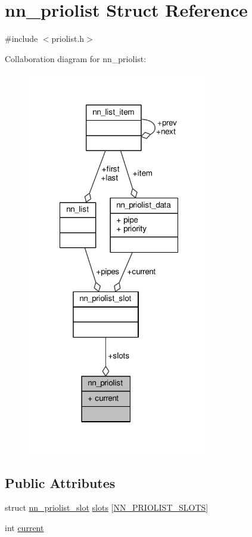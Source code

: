 \hypertarget{structnn__priolist}{}\section{nn\+\_\+priolist Struct Reference}
\label{structnn__priolist}


{\ttfamily \#include $<$priolist.\+h$>$}



Collaboration diagram for nn\+\_\+priolist\+:\nopagebreak
\begin{figure}[H]
\begin{center}
\leavevmode
\includegraphics[width=227pt]{structnn__priolist__coll__graph}
\end{center}
\end{figure}
\subsection*{Public Attributes}
\begin{DoxyCompactItemize}
\item 
struct \hyperlink{structnn__priolist__slot}{nn\+\_\+priolist\+\_\+slot} \hyperlink{structnn__priolist_a2325d0c41356c41805714ce2e14a6d11}{slots} \mbox{[}\hyperlink{priolist_8h_a6394497883af24be47fd3ee4e9a0a598}{N\+N\+\_\+\+P\+R\+I\+O\+L\+I\+S\+T\+\_\+\+S\+L\+O\+TS}\mbox{]}
\item 
int \hyperlink{structnn__priolist_ad3ba3f789844959e4796cabf18acebcf}{current}
\end{DoxyCompactItemize}


